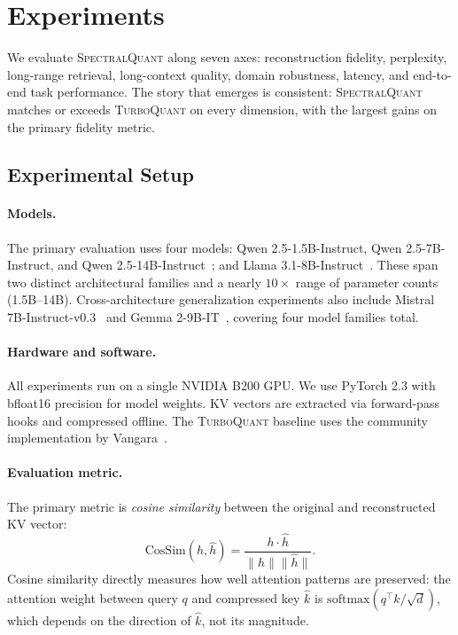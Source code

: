 \documentclass[11pt]{article}
\newcommand{\TQ}{\textsc{TurboQuant}}
\newcommand{\SQ}{\textsc{SpectralQuant}}
\newcommand{\softmax}{\mathrm{softmax}}
\begin{document}
\section{Experiments}
\label{sec:experiments}

We evaluate \SQ{} along seven axes: reconstruction fidelity, perplexity,
long-range retrieval, long-context quality, domain robustness, latency, and
end-to-end task performance.  The story that emerges is consistent: \SQ{}
matches or exceeds \TQ{} on every dimension, with the largest gains on the
primary fidelity metric.

\subsection{Experimental Setup}
\label{sec:setup}

\paragraph{Models.}
The primary evaluation uses four models: Qwen 2.5-1.5B-Instruct, Qwen
2.5-7B-Instruct, and Qwen 2.5-14B-Instruct~\citep{qwen25}; and Llama
3.1-8B-Instruct~\citep{dubey2024llama3}.  These span two distinct
architectural families and a nearly $10\times$ range of parameter counts
(1.5B--14B).  Cross-architecture generalization experiments also
include Mistral 7B-Instruct-v0.3~\citep{mistral7b} and Gemma
2-9B-IT~\citep{gemma2}, covering four model families total.

\paragraph{Hardware and software.}
All experiments run on a single NVIDIA B200 GPU.  We use PyTorch 2.3 with
bfloat16 precision for model weights.  KV vectors are extracted via
forward-pass hooks and compressed offline.  The \TQ{} baseline uses the
community implementation by Vangara~\citep{vangara2026turboquant_cutile}.

\paragraph{Evaluation metric.}
The primary metric is \emph{cosine similarity} between the original and
reconstructed KV vector:
\[
  \mathrm{CosSim}(h, \hat{h}) = \frac{h \cdot \hat{h}}{\|h\|\|\hat{h}\|}.
\]
Cosine similarity directly measures how well attention patterns are preserved:
the attention weight between query $q$ and compressed key $\hat{k}$ is
$\softmax(q^\top \hat{k} / \sqrt{d})$, which depends on the direction of
$\hat{k}$, not its magnitude.
\end{document}
